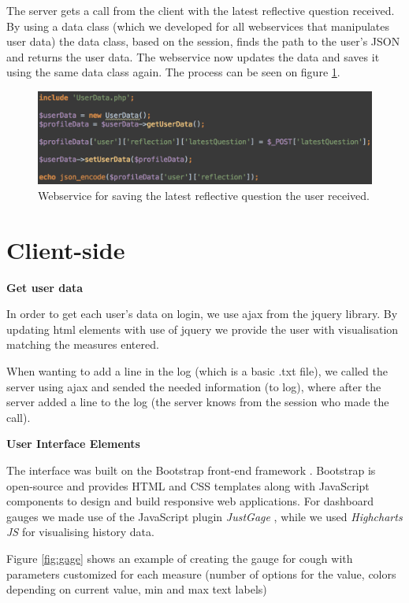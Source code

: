 The server gets a call from the client with the latest reflective question received. By using a data class (which we developed for all webservices that manipulates user data) the data class, based on the session, finds the path to the user's JSON and returns the user data. The webservice now updates the data and saves it using the same data class again. The process can be seen on figure \ref{fig:webservice}.

\begin{figure}[h]
\centering
\includegraphics[scale=0.5]{images/implementation/webservice.png}
\caption{Webservice for saving the latest reflective question the user received.}
\label{fig:webservice}
\end{figure}
 
\section{Client-side}

\textbf{Get user data}

In order to get each user's data on login, we use ajax from the jquery library. By updating html elements with use of jquery we provide the user with visualisation matching the measures entered.

When wanting to add a line in the log (which is a basic .txt file), we called the server using ajax and sended the needed information (to log), where after the server added a line to the log (the server knows from the session who made the call).


\textbf{User Interface Elements}

The interface was built on the Bootstrap front-end framework \citep{bootstrap}. Bootstrap is open-source and provides HTML and CSS templates along with JavaScript components to design and build responsive web applications. For dashboard gauges we made use of the JavaScript plugin \textit{JustGage} \citep{justgage}, while we used \textit{Highcharts JS} \citep{highcharts} for visualising history data. 

Figure \ref{fig:gage} shows an example of creating the gauge for cough with parameters customized for each measure (number of options for the value, colors depending on current value, min and max text labels) 

